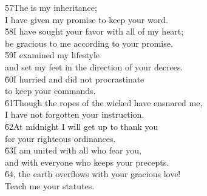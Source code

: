 \begin{poetry}
\poeml \v{57}The  is my inheritance; \\
\poemll    I have given my promise to keep your word. \\
\poeml \v{58}I have sought your favor with all of my heart; \\
\poemll    be gracious to me according to your promise. \\
\poeml \v{59}I examined my lifestyle \\
\poemll    and set my feet in the direction of your decrees. \\
\poeml \v{60}I hurried and did not procrastinate \\
\poemll    to keep your commands. \\
\poeml \v{61}Though the ropes of the wicked have ensnared me, \\
\poemll    I have not forgotten your instruction. \\
\poeml \v{62}At midnight I will get up to thank you \\
\poemll    for your righteous ordinances. \\
\poeml \v{63}I am united with all who fear you, \\
\poemll    and with everyone who keeps your precepts. \\
\poeml \v{64}, the earth overflows with your gracious love! \\
\poemll    Teach me your statutes.
\end{poetry}

